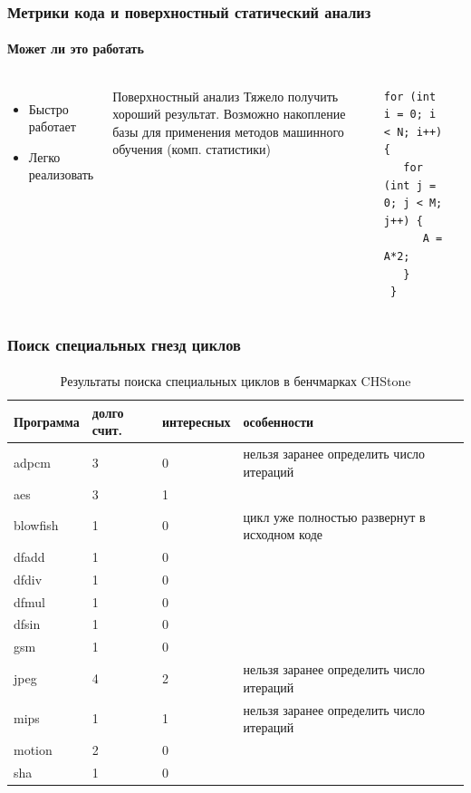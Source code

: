 \documentclass{beamer}              %
\begin{document}
\begin{frame}[fragile]
\frametitle{Метрики кода и поверхностный статический анализ}
  \framesubtitle{Может ли это работать}
  \begin{columns}
      \begin{itemize}
        \item Быстро работает
        \item Легко реализовать
      \end{itemize}
      
      \begin{block}{Поверхностный анализ}
         Тяжело получить хороший результат. Возможно накопление базы для применения методов машинного обучения (комп. статистики)
      \end{block}

      
      
\begin{lstlisting}[frame=single]
 for (int i = 0; i < N; i++) {
   for (int j = 0; j < M; j++) {
      A = A*2;
   }
 }
\end{lstlisting}
\label{clone_listing}
      
  \end{columns}
  
\end{frame}

\begin{frame}[fragile]
\frametitle{Поиск специальных гнезд циклов}
  \framesubtitle{}
  \begin{table}
    \small
    \begin{tabular}{ | p{1.5cm} | p{2cm} | p{1cm} | p{6cm} |}
    \hline
    Программа & долго счит. & интересных & особенности \\ \hline
    adpcm & 3 & 0 & нельзя заранее определить число итераций \\ \hline
    aes & 3 & 1 &  \\ \hline
    blowfish & 1 & 0 & цикл уже полностью развернут в исходном коде \\ \hline
    dfadd & 1 & 0 &  \\ \hline
    dfdiv & 1 & 0 &  \\ \hline
    dfmul & 1 & 0 &  \\ \hline
    dfsin & 1 & 0 &  \\ \hline
    gsm & 1 & 0 &  \\ \hline
    jpeg & 4 & 2 & нельзя заранее определить число итераций \\ \hline
    mips & 1 & 1 & нельзя заранее определить число итераций \\ \hline
    motion & 2 & 0 &  \\ \hline
    sha & 1 & 0 &  \\ \hline
    \end{tabular} 
    \caption{Результаты поиска специальных циклов в бенчмарках CHStone}
    \label{table:CHStoneSingularLoops}
\end{table}
\end{frame}
\end{document}
